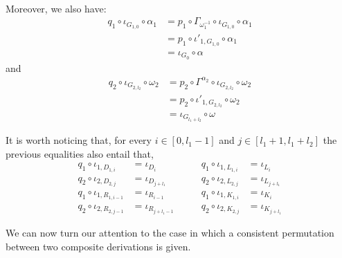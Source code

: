 \documentclass[a4paper,UKenglish,cleveref,pdftex, thm-restate,numberwithinsect]{lipics}
\begin{document}
\begin{remark}
\begin{itemize}
\[\begin{split}
		\end{split}\]
		Moreover, we also have:
			\begin{align*}
			q_1\circ \iota_{G_{1,0}}\circ \alpha_1&= p_1\circ \Gamma_{\omega^{-1}_1}\circ \iota_{G_{1,0}}\circ \alpha_1 \\&=p_1\circ \iota'_{1, G_{1,0}} \circ \alpha_1 \\&= \iota_{G_{0}}\circ \alpha
			\end{align*} 
		and
			\begin{align*}
		q_2\circ \iota_{G_{2,l_2}}\circ \omega_2&= p_2\circ \Gamma^{\alpha_2}\circ \iota_{G_{2,l_2}}\circ \omega_2 \\&=p_2\circ \iota'_{1, G_{2,l_2}} \circ \omega_2 \\&= \iota_{G_{l_1+l_2}}\circ \omega
			\end{align*}			
			\end{itemize}
		
It is worth noticing that, for every $i\in [0,l_1-1]$ and $j\in [l_1+1, l_1+l_2]$ the previous equalities also entail that,
\[\begin{split}q_1\circ \iota_{1, D_{1,i}}&=\iota_{D_{i}}\\q_2\circ \iota_{2, D_{2,j}}&=\iota_{D_{j+l_1}} 	\\q_1\circ \iota_{1, R_{1,i-1}}&=\iota_{R_{i-1}} \\
	q_2\circ \iota_{2, R_{2,j-1}}&=\iota_{R_{j+l_1-1}}
\end{split} \qquad 
\begin{split}    	q_1\circ \iota_{1, L_{1,i}}&=\iota_{L_{i}} \\q_2\circ \iota_{2, L_{2,j}}&=\iota_{L_{j+l_1}}\\ q_1\circ \iota_{1, K_{1,i}}&=\iota_{K_{i}}\\q_2\circ \iota_{2, K_{2,j}}&=\iota_{K_{j+l_1}}\end{split}\]
\end{remark}

We can now turn our attention to the case in which a consistent permutation between two composite derivations is given.
\end{document}
